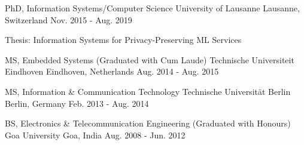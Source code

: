 

\begin{cventries}

  \cventry
    {PhD, Information Systems/Computer Science} %
    {University of Lausanne} %
    {Lausanne, Switzerland} %
    {Nov. 2015 - Aug. 2019} %
    {
      \begin{cvitems} %
        \item {Thesis: Information Systems for Privacy-Preserving ML Services}
      \end{cvitems}
    }
    
    \vspace{-3px}
    \cventry
    {MS, Embedded Systems (Graduated with Cum Laude)}
    {Technische Universiteit Eindhoven}
    {Eindhoven, Netherlands}
    {Aug. 2014 - Aug. 2015}
    {}
	
	\vspace{-10px}
    \cventry
    {MS, Information \& Communication Technology} %
    {Technische Universität Berlin} %
    {Berlin, Germany} %
    {Feb. 2013 - Aug. 2014} %
    {}
    
	\vspace{-10px}
    \cventry
    {BS, Electronics \& Telecommunication Engineering (Graduated with Honours)} %
    {Goa University} %
    {Goa, India} %
    {Aug. 2008 - Jun. 2012} %
    {}
	
	\vspace{-10px}
\end{cventries}
